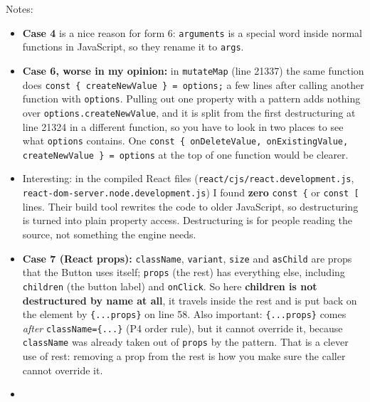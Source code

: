 Notes:

\begin{itemize}
\tightlist
\item
  \textbf{Case 4} is a nice reason for form 6: \passthrough{\lstinline!arguments!} is a special word inside normal functions in JavaScript, so they rename it to \passthrough{\lstinline!args!}.
\item
  \textbf{Case 6, worse in my opinion:} in \passthrough{\lstinline!mutateMap!} (line 21337) the same function does \passthrough{\lstinline!const \{ createNewValue \} = options;!} a few lines after calling another function with \passthrough{\lstinline!options!}. Pulling out one property with a pattern adds nothing over \passthrough{\lstinline!options.createNewValue!}, and it is split from the first destructuring at line 21324 in a different function, so you have to look in two places to see what \passthrough{\lstinline!options!} contains. One \passthrough{\lstinline!const \{ onDeleteValue, onExistingValue, createNewValue \} = options!} at the top of one function would be clearer.
\item
  Interesting: in the compiled React files (\passthrough{\lstinline!react/cjs/react.development.js!}, \passthrough{\lstinline!react-dom-server.node.development.js!}) I found \textbf{zero} \passthrough{\lstinline!const \{!} or \passthrough{\lstinline!const [!} lines. Their build tool rewrites the code to older JavaScript, so destructuring is turned into plain property access. Destructuring is for people reading the source, not something the engine needs.
\item
  \textbf{Case 7 (React props):} \passthrough{\lstinline!className!}, \passthrough{\lstinline!variant!}, \passthrough{\lstinline!size!} and \passthrough{\lstinline!asChild!} are props that the Button uses itself; \passthrough{\lstinline!props!} (the rest) has everything else, including \passthrough{\lstinline!children!} (the button label) and \passthrough{\lstinline!onClick!}. So here \textbf{children is not destructured by name at all}, it travels inside the rest and is put back on the element by \passthrough{\lstinline!\{...props\}!} on line 58. Also important: \passthrough{\lstinline!\{...props\}!} comes \emph{after} \passthrough{\lstinline!className=\{...\}!} (P4 order rule), but it cannot override it, because \passthrough{\lstinline!className!} was already taken out of \passthrough{\lstinline!props!} by the pattern. That is a clever use of rest: removing a prop from the rest is how you make sure the caller cannot override it.
\item

\end{itemize}
